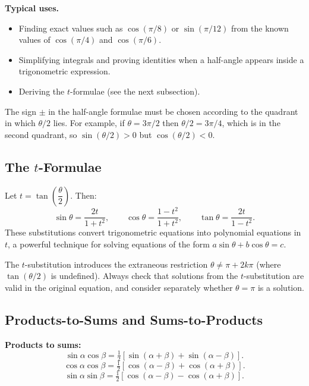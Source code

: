 \documentclass[12pt]{article}
\newenvironment{remark}[1][]{%
  \begin{remarkbox}[title={\bfseries Remark~\thetcbcounter\ifx\relax#1\relax\else\ (#1)\fi}]%
}{%
  \end{remarkbox}%
}
\begin{document}
\textbf{Typical uses.}
\begin{itemize}[leftmargin=*]
  \item Finding exact values such as $\cos(\pi/8)$ or $\sin(\pi/12)$ from the
        known values of $\cos(\pi/4)$ and $\cos(\pi/6)$.
  \item Simplifying integrals and proving identities when a half-angle appears
        inside a trigonometric expression.
  \item Deriving the $t$-formulae (see the next subsection).
\end{itemize}

\begin{remark}
The sign $\pm$ in the half-angle formulae must be chosen according to the
quadrant in which $\theta/2$ lies. For example, if $\theta = 3\pi/2$ then
$\theta/2 = 3\pi/4$, which is in the second quadrant, so $\sin(\theta/2) > 0$
but $\cos(\theta/2) < 0$.
\end{remark}

\subsection{The $t$-Formulae}

Let $t = \tan\!\left(\dfrac{\theta}{2}\right)$. Then:
\[
\sin\theta = \frac{2t}{1+t^2}, \qquad
\cos\theta = \frac{1-t^2}{1+t^2}, \qquad
\tan\theta = \frac{2t}{1-t^2}.
\]
These substitutions convert trigonometric equations into polynomial equations in $t$, a powerful technique for solving equations of the form $a\sin\theta + b\cos\theta = c$.

\begin{remark}
The $t$-substitution introduces the extraneous restriction $\theta \neq \pi + 2k\pi$ (where $\tan(\theta/2)$ is undefined). Always check that solutions from the $t$-substitution are valid in the original equation, and consider separately whether $\theta = \pi$ is a solution.
\end{remark}

\subsection{Products-to-Sums and Sums-to-Products}

\textbf{Products to sums:}
\[
\sin\alpha\cos\beta = \tfrac{1}{2}[\sin(\alpha+\beta)+\sin(\alpha-\beta)].
\]
\[
\cos\alpha\cos\beta = \tfrac{1}{2}[\cos(\alpha-\beta)+\cos(\alpha+\beta)].
\]
\[
\sin\alpha\sin\beta = \tfrac{1}{2}[\cos(\alpha-\beta)-\cos(\alpha+\beta)].
\]
\end{document}
